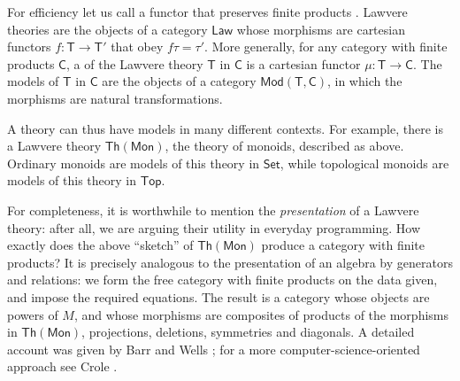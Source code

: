 \documentclass{amsart}
\newcommand{\define}[1]{{\bf \boldmath{#1}}}
\theoremstyle{definition}
\newcommand{\Th}{\mathsf{Th}}
\newcommand{\Set}{\mathsf{Set}}
\newcommand{\Law}{\mathsf{Law}}
\newcommand{\Top}{\mathsf{Top}}
\newcommand{\Mon}{\mathsf{Mon}}
\newcommand{\Mod}{\mathsf{Mod}}
\newcommand{\C}{\mathsf{C}}
\newcommand{\T}{\mathsf{T}}
\newcommand{\maps}{\colon}
\begin{document}
For efficiency let us call a functor that preserves finite products \define{cartesian}.   Lawvere theories are the objects of a category $\Law$ whose morphisms are cartesian functors $f \maps \T\to \T'$ that obey $f\tau = \tau'$.   More generally, for any category with finite products $\C$, a \define{model} of the Lawvere theory $\T$ in $\C$ is a cartesian functor $\mu \maps \T \to \C$.  The models of $\T$ in $\C$ are the objects of a category $\Mod(\T,\C)$, in which the morphisms are natural transformations.  

A theory can thus have models in many different contexts.   For example, there is a Lawvere theory $\Th(\Mon)$, the theory of monoids, described as above.  Ordinary monoids are models of this theory in $\Set$, while topological monoids are models of this theory in $\Top$.

For completeness, it is worthwhile to mention the \textit{presentation} of a Lawvere theory: after all, we are arguing their utility in everyday programming.  How exactly does the above ``sketch'' of $\Th(\Mon)$ produce a category with finite products?  It is precisely analogous to the presentation of an algebra by generators and relations: we form the free category with finite products on the data given, and impose the required equations. The result is a category whose objects are powers of $M$, and whose morphisms are composites of products of the morphisms in $\Th(\Mon)$, projections, deletions, symmetries and diagonals.  A detailed account was given by Barr and Wells \cite[Chap.\ 4]{barrwells}; for a more computer-science-oriented approach see Crole \cite[Chap.\ 3]{crole}.
\end{document}
